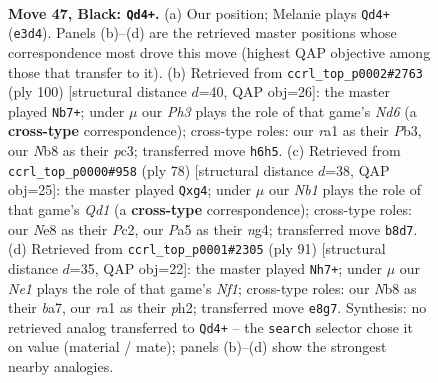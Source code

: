 \documentclass[11pt]{article}
\begin{document}
\clearpage

\begin{figure}[p]\centering
\begin{subfigure}{0.46\textwidth}\centering
\resizebox{\linewidth}{!}{%
\newchessgame
\chessboard[
  setfen={1n2nk2/7Q/7p/p4p2/P6K/4q3/3N4/R7 b - - 2 47},
  showmover=false,
  pgfstyle=straightmove, color=movearrow, markmove={e3-d4}
]}
\caption{}
\end{subfigure}\hfill
\begin{subfigure}{0.46\textwidth}\centering
\resizebox{\linewidth}{!}{%
\newchessgame
\chessboard[
  setfen={3k4/4n2p/3NQ3/6P1/8/pPp5/P6q/1K6 w - - 14 51},
  showmover=false,
  pgfstyle=straightmove, color=movearrow, markmove={d6-b7}
]}
\caption{}
\end{subfigure}
\\[4pt]
\begin{subfigure}{0.46\textwidth}\centering
\resizebox{\linewidth}{!}{%
\newchessgame
\chessboard[
  setfen={6k1/8/2p3p1/1p1N4/6n1/6q1/2P3P1/3Q3K w - - 0 40},
  showmover=false,
  pgfstyle=straightmove, color=movearrow, markmove={d1-g4}
]}
\caption{}
\end{subfigure}\hfill
\begin{subfigure}{0.46\textwidth}\centering
\resizebox{\linewidth}{!}{%
\newchessgame
\chessboard[
  setfen={5n2/B5k1/2p5/2P1p1K1/5p2/5q2/3Q1N1P/8 b - - 2 46},
  showmover=false,
  pgfstyle=straightmove, color=movearrow, markmove={f8-h7}
]}
\caption{}
\end{subfigure}
\caption{\textbf{Move 47, Black: \texttt{Qd4+}.} (a) Our position; Melanie plays \texttt{Qd4+} (\texttt{e3d4}). Panels (b)--(d) are the retrieved master positions whose correspondence most drove this move (highest QAP objective among those that transfer to it). (b) Retrieved from \texttt{ccrl\_top\_p0002\#2763} (ply 100) [structural distance $d$=40, QAP obj=26]: the master played \texttt{Nb7+}; under $\mu$ our \emph{Ph3} plays the role of that game's \emph{Nd6} (a \textbf{cross-type} correspondence); cross-type roles: our \emph{r}a1 as their \emph{P}b3, our \emph{N}b8 as their \emph{p}c3; transferred move \texttt{h6h5}. (c) Retrieved from \texttt{ccrl\_top\_p0000\#958} (ply 78) [structural distance $d$=38, QAP obj=25]: the master played \texttt{Qxg4}; under $\mu$ our \emph{Nb1} plays the role of that game's \emph{Qd1} (a \textbf{cross-type} correspondence); cross-type roles: our \emph{N}e8 as their \emph{P}c2, our \emph{P}a5 as their \emph{n}g4; transferred move \texttt{b8d7}. (d) Retrieved from \texttt{ccrl\_top\_p0001\#2305} (ply 91) [structural distance $d$=35, QAP obj=22]: the master played \texttt{Nh7+}; under $\mu$ our \emph{Ne1} plays the role of that game's \emph{Nf1}; cross-type roles: our \emph{N}b8 as their \emph{b}a7, our \emph{r}a1 as their \emph{p}h2; transferred move \texttt{e8g7}. Synthesis: no retrieved analog transferred to \texttt{Qd4+} -- the \texttt{search} selector chose it on value (material / mate); panels (b)--(d) show the strongest nearby analogies.}
\label{fig:thought-m93}
\end{figure}
\end{document}
